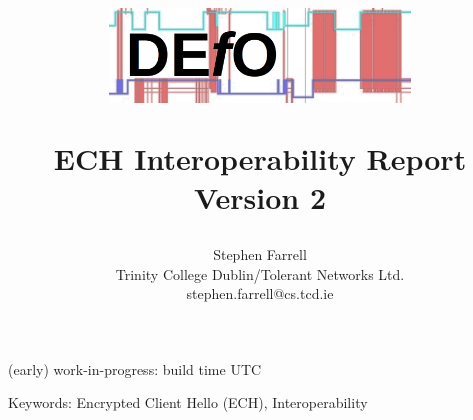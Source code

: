 \documentclass[a4paper]{article}
\begin{document}

\title{
    \begin{center}
\includegraphics[width=0.6\textwidth]{defologo.png}
    \end{center}
ECH Interoperability Report\\
Version 2
}

\author{
Stephen Farrell\\
Trinity College Dublin/Tolerant Networks Ltd.\\
\small
stephen.farrell@cs.tcd.ie\\
\normalsize
}





\maketitle
\begin{center}
\small
(early) work-in-progress: build time {\currenttime} UTC\\
\normalsize
\end{center}



\clearpage
\small
\tableofcontents
\normalsize

Keywords: Encrypted Client Hello (ECH), Interoperability












\appendices




\end{document}
